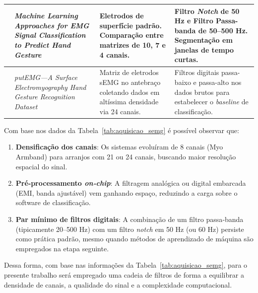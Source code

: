 \begin{table}[H]
\begin{tabularx}{\textwidth}{@{} 
        >{\RaggedRight\arraybackslash}X 
        >{\RaggedRight\arraybackslash}X 
        >{\RaggedRight\arraybackslash}X 
        >{\RaggedRight\arraybackslash}X 
        @{}}
        \midrule
        \citet{Rendon_Caballero2026-ar} & \textit{Machine Learning Approaches for EMG Signal Classification to Predict Hand Gesture} & Eletrodos de superfície padrão. Comparação entre matrizes de 10, 7 e 4 canais. & Filtro \textit{Notch} de 50 Hz e Filtro Passa-banda de 50--500 Hz. Segmentação em janelas de tempo curtas. \\
        \midrule
        \citet{Kaczmarek2019-mw} & \textit{putEMG—A Surface Electromyography Hand Gesture Recognition Dataset} & Matriz de eletrodos sEMG no antebraço coletando dados em altíssima densidade via 24 canais. & Filtros digitais passa-baixo e passa-alto nos dados brutos para estabelecer o \textit{baseline} de classificação. \\
        \bottomrule
    \end{tabularx}
\end{table}

Com base nos dados da Tabela~\ref{tab:aquisicao_semg} é possível observar que:
\begin{enumerate}
    \item \textbf{Densificação dos canais}: Os sistemas evoluíram de 8 canais (Myo Armband) para arranjos com 21 ou 24 canais, buscando maior resolução espacial do sinal.
    \item \textbf{Pré‑processamento \textit{on‑chip}}: A filtragem analógica ou digital embarcada (EMI, banda ajustável) vem ganhando espaço, reduzindo a carga sobre o software de classificação.
    \item \textbf{Par mínimo de filtros digitais}: A combinação de um filtro passa‑banda (tipicamente 20–500 Hz) com um filtro \textit{notch} em 50 Hz (ou 60 Hz) persiste como prática padrão, mesmo quando métodos de aprendizado de máquina são empregados na etapa seguinte.
\end{enumerate}
Dessa forma, com base nas informações da Tabela~\ref{tab:aquisicao_semg}, para o presente trabalho será empregado uma cadeia de filtros de forma a equilibrar a densidade de canais, a qualidade do sinal e a complexidade computacional.